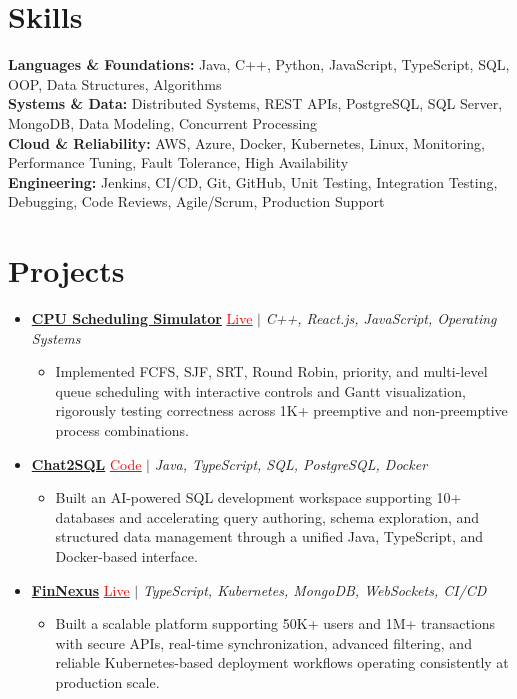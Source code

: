 \documentclass[letterpaper,10pt]{article}
\newcommand{\itemTail}{\vspace{-5pt}}
\newcommand{\sectionGap}{\vspace{-8pt}}
\newcommand{\projGap}{\vspace{3pt}}
\newcommand{\resumeItem}[1]{\item\small{{#1 \itemTail}}}
\newcommand{\resumeProjectHeading}[1]{\item \small #1 \vspace{-2pt}}
\newcommand{\resumeProjectLink}[2]{\href{#1}{\textcolor{red}{\underline{#2}}}}
\newcommand{\resumeSubHeadingListStart}{\begin{itemize}[leftmargin=0.0in, label={}]}
\newcommand{\resumeSubHeadingListEnd}{\end{itemize}}
\newcommand{\resumeProjItemListStart}{\begin{itemize}[leftmargin=0.15in,label=\textbullet,itemsep=3pt,topsep=0pt,parsep=0pt,partopsep=0pt]}
\newcommand{\resumeProjItemListEnd}{\end{itemize}\vspace{-4pt}}
\begin{document}
\section{Skills}
\begin{itemize}[leftmargin=0.15in, label={}]
\small{\item{
\textbf{Languages \& Foundations:} Java, C++, Python, JavaScript, TypeScript, SQL, OOP, Data Structures, Algorithms \\
\textbf{Systems \& Data:} Distributed Systems, REST APIs, PostgreSQL, SQL Server, MongoDB, Data Modeling, Concurrent Processing \\
\textbf{Cloud \& Reliability:} AWS, Azure, Docker, Kubernetes, Linux, Monitoring, Performance Tuning, Fault Tolerance, High Availability \\
\textbf{Engineering:} Jenkins, CI/CD, Git, GitHub, Unit Testing, Integration Testing, Debugging, Code Reviews, Agile/Scrum, Production Support
}}
\end{itemize}
\sectionGap
\section{Projects}
\resumeSubHeadingListStart
\vspace{-2pt}
\resumeProjectHeading{\href{https://cpu-scheduler-amber.vercel.app/}{\textbf{CPU Scheduling Simulator}} \resumeProjectLink{https://cpu-scheduler-amber.vercel.app/}{Live} $|$ \emph{C++, React.js, JavaScript, Operating Systems}}
\resumeProjItemListStart
\resumeItem{Implemented FCFS, SJF, SRT, Round Robin, priority, and multi-level queue scheduling with interactive controls and Gantt visualization, rigorously testing correctness across 1K+ preemptive and non-preemptive process combinations.}
\resumeProjItemListEnd
\projGap
\resumeProjectHeading{\href{https://github.com/SAHAJ-BHADJA/Chat2SQL}{\textbf{Chat2SQL}} \resumeProjectLink{https://github.com/SAHAJ-BHADJA/Chat2SQL}{Code} $|$ \emph{Java, TypeScript, SQL, PostgreSQL, Docker}}
\resumeProjItemListStart
\resumeItem{Built an AI-powered SQL development workspace supporting 10+ databases and accelerating query authoring, schema exploration, and structured data management through a unified Java, TypeScript, and Docker-based interface.}
\resumeProjItemListEnd
\projGap
\resumeProjectHeading{\href{https://fin-nexus.vercel.app/}{\textbf{FinNexus}} \resumeProjectLink{https://fin-nexus.vercel.app/}{Live} $|$ \emph{TypeScript, Kubernetes, MongoDB, WebSockets, CI/CD}}
\resumeProjItemListStart
\resumeItem{Built a scalable platform supporting 50K+ users and 1M+ transactions with secure APIs, real-time synchronization, advanced filtering, and reliable Kubernetes-based deployment workflows operating consistently at production scale.}
\resumeProjItemListEnd
\resumeSubHeadingListEnd
\end{document}
